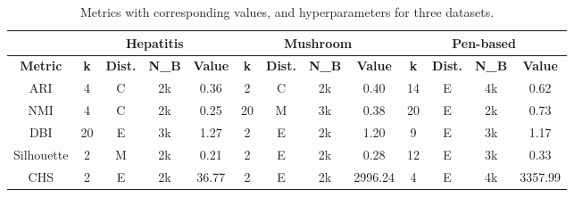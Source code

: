 \begin{table}[h!]
    \centering
    \begin{tabular}{|c|cccc|cccc|cccc|}
        \hline
                        & \multicolumn{4}{c|}{\textbf{Hepatitis}} & \multicolumn{4}{c|}{\textbf{Mushroom}} & \multicolumn{4}{c|}{\textbf{Pen-based}} \\ \hline
        \textbf{Metric} & \textbf{k} & \textbf{Dist.} & \textbf{N\_B} & \textbf{Value} 
                        & \textbf{k} & \textbf{Dist.} & \textbf{N\_B} & \textbf{Value}
                        & \textbf{k} & \textbf{Dist.} & \textbf{N\_B} & \textbf{Value} \\ \hline
        ARI            & 4          & C         & 2k      & 0.36
                       & 2          & C         & 2k        & 0.40
                       & 14          & E             & 4k       & 0.62 \\ \hline
        NMI            & 4          & C             & 2k        & 0.25
                       & 20          & M         & 3k       & 0.38 
                       & 20          & E         & 2k       & 0.73 \\ \hline
        DBI            & 20         & E         & 3k        & 1.27
                       & 2         & E             & 2k     & 1.20 
                       & 9         & E         & 3k     & 1.17 \\ \hline
        Silhouette     & 2          & M         & 2k        & 0.21
                       & 2          & E         & 2k        & 0.28
                       & 12          & E             & 3k       & 0.33 \\ \hline
        CHS            & 2          & E         & 2k        & 36.77
                       & 2          & E         & 2k        & 2996.24 
                       & 4          & E         & 4k        & 3357.99 \\ \hline
    \end{tabular}
    \caption{Metrics with corresponding values, and hyperparameters for three datasets.}
    \label{tab:kmeans:best_runs}
\end{table}

